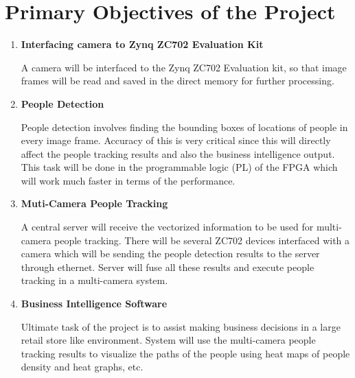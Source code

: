 \documentclass[12pt,a4paper]{report}
\begin{document}
\section{Primary Objectives of the Project}
\begin{enumerate}
\item{\textbf{Interfacing camera to Zynq ZC702 Evaluation Kit}}
\par A camera will be interfaced to the Zynq ZC702 Evaluation kit, so that image frames will be read and saved in the direct memory for further processing.
\item{\textbf{People Detection}}
\par People detection involves finding the bounding boxes of locations of people in every image frame. Accuracy of this is very critical since this will directly affect the people tracking results and also the business intelligence output. This task will be done in the programmable logic (PL) of the FPGA which will work much faster in terms of the performance.
\item{\textbf{Muti-Camera People Tracking}}
\par A central server will receive the vectorized information to be used for multi-camera people tracking. There will be several ZC702 devices interfaced with a camera which will be sending the people detection results to the server through ethernet. Server will fuse all these results and execute people tracking in a multi-camera system.
\item{\textbf{Business Intelligence Software}}
\par Ultimate task of the project is to assist making business decisions in a large retail store like environment. System will use the multi-camera people tracking results to visualize the paths of the people using heat maps of people density and heat graphs, etc.
\end{enumerate}
\end{document}
